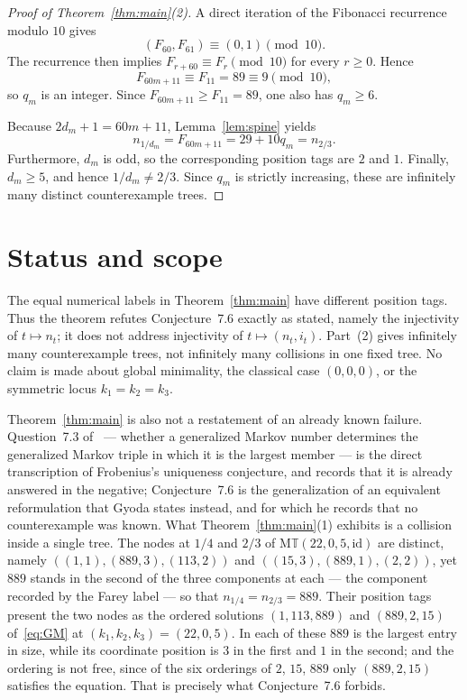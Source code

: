 \documentclass[11pt]{amsart}
\newcommand{\GMT}{\mathrm{M}\mathbb{T}}
\newcommand{\id}{\mathrm{id}}
\begin{document}
\begin{proof}[Proof of Theorem~\ref{thm:main}(2)]
A direct iteration of the Fibonacci recurrence modulo $10$ gives
\[
 (F_{60},F_{61})\equiv(0,1)\pmod{10}.
\]
The recurrence then implies
$F_{r+60}\equiv F_r\pmod{10}$ for every $r\ge0$. Hence
\[
 F_{60m+11}\equiv F_{11}=89\equiv9\pmod{10},
\]
so $q_m$ is an integer. Since $F_{60m+11}\ge F_{11}=89$, one also has
$q_m\ge6$.

Because $2d_m+1=60m+11$, Lemma~\ref{lem:spine} yields
\[
 n_{1/d_m}
 =F_{60m+11}
 =29+10q_m
 =n_{2/3}.
\]
Furthermore, $d_m$ is odd, so the corresponding position tags are $2$ and
$1$. Finally, $d_m\ge5$, and hence $1/d_m\ne2/3$. Since $q_m$ is strictly
increasing, these are infinitely many distinct counterexample trees.
\end{proof}

\section*{Status and scope}

The equal numerical labels in Theorem~\ref{thm:main} have different position
tags. Thus the theorem refutes Conjecture~7.6 exactly as stated, namely the
injectivity of $t\mapsto n_t$; it does not address injectivity of
$t\mapsto(n_t,i_t)$. Part~(2) gives infinitely many counterexample trees,
not infinitely many collisions in one fixed tree. No claim is made about
global minimality, the classical case $(0,0,0)$, or the symmetric locus
$k_1=k_2=k_3$.

Theorem~\ref{thm:main} is also not a restatement of an already known failure.
Question~7.3 of~\cite{Gyoda} --- whether a generalized Markov number
determines the generalized Markov triple in which it is the largest member ---
is the direct transcription of Frobenius's uniqueness conjecture, and
\cite{Gyoda} records that it is already answered in the negative; Conjecture~7.6
is the generalization of an equivalent reformulation that Gyoda states instead,
and for which he records that no counterexample was known. What
Theorem~\ref{thm:main}(1) exhibits is a collision inside a single tree. The
nodes at $1/4$ and $2/3$ of $\GMT(22,0,5,\id)$ are distinct, namely
$((1,1),(889,3),(113,2))$ and $((15,3),(889,1),(2,2))$, yet $889$ stands in the
second of the three components at each --- the component recorded by the Farey
label --- so that $n_{1/4}=n_{2/3}=889$. Their position tags present the two
nodes as the ordered solutions $(1,113,889)$ and $(889,2,15)$
of~\eqref{eq:GM} at $(k_1,k_2,k_3)=(22,0,5)$. In each of these $889$ is the
largest entry in size, while its coordinate position is $3$ in the first and
$1$ in the second; and the ordering is not free, since of the six orderings of
$2$, $15$, $889$ only $(889,2,15)$ satisfies the equation. That is precisely
what Conjecture~7.6 forbids.
\end{document}
